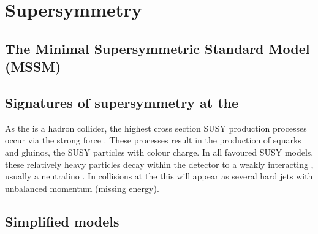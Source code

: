 \section{Supersymmetry}
\label{sec:susy}




\subsection{The Minimal Supersymmetric Standard Model (MSSM)}

\subsection{Signatures of supersymmetry at the \LHC}

As the \LHC is a hadron collider, the highest cross section SUSY
production processes occur via the strong force
\cite{Martin:1997ns}
\cite{SUSYxsections_NewAspectsof_pp_collisions}. These processes
result in the production of squarks and gluinos, the SUSY particles
with colour charge. In all favoured SUSY models, these relatively
heavy particles decay within the detector to a weakly interacting \LSP,
usually a neutralino \cite{Farrar:1978xj}. In
collisions at the \LHC this will appear as several hard jets with
unbalanced momentum (missing energy). 

\subsection{Simplified models}

